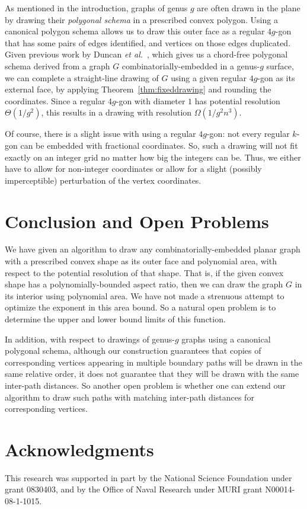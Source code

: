 \documentclass[11pt]{article}
\begin{document}
  As mentioned in the introduction,
  graphs of genus $g$ are often drawn in the plane by drawing their \emph {polygonal schema} in a
  prescribed convex polygon. Using a canonical polygon schema
  allows us to draw this outer face
  as a
  regular $4g$-gon that has some pairs of edges identified,
  and vertices on those edges
  duplicated.
  Given previous work by Duncan {\it et al.}~\cite{duncan},
  which gives us a chord-free polygonal schema derived from a graph
  $G$ combinatorially-embedded in a genus-$g$ surface, we can
  complete a straight-line drawing of $G$ using a given regular $4g$-gon as
  its external face, by
  applying Theorem~\ref {thm:fixeddrawing} and rounding the
  coordinates.
  Since a regular $4g$-gon with diameter $1$ has potential resolution $\Theta(1/g^2)$, this results in a
  drawing with resolution $\Omega(1/g^2n^3)$.

Of course, there is a
  slight issue with using a regular $4g$-gon:
  not every regular $k$-gon can be embedded with fractional
  coordinates.
  So, such a drawing will not fit exactly on an integer grid no matter how big the
  integers can be.
  Thus, we either have to allow for non-integer coordinates or allow
  for a slight (possibly imperceptible) perturbation of the vertex
  coordinates.

\section{Conclusion and Open Problems}
We have given an algorithm to draw any combinatorially-embedded
planar graph with a prescribed convex shape as its outer face and
polynomial area, with respect to the potential resolution of that
shape. That is, if the given convex shape has a polynomially-bounded
aspect ratio, then we can draw the graph $G$ in its interior using
polynomial area.
We have not made a strenuous attempt to optimize the exponent in this
area bound. So a natural open problem is to determine the upper and
lower bound limits of this function.

In addition, with respect to drawings of genus-$g$ graphs using a
canonical polygonal schema, although our construction guarantees that
copies of corresponding
vertices appearing in multiple boundary paths
will be drawn in the same relative order,
it does not guarantee that they will be drawn with the same
inter-path distances.
So another open problem is whether one can extend our algorithm to
draw such paths with matching inter-path distances for corresponding
vertices.

\section*{Acknowledgments}
This research was supported in part by the National Science
Foundation under grant 0830403, and by the
Office of Naval Research under MURI grant N00014-08-1-1015.

\raggedright


\end{document}
